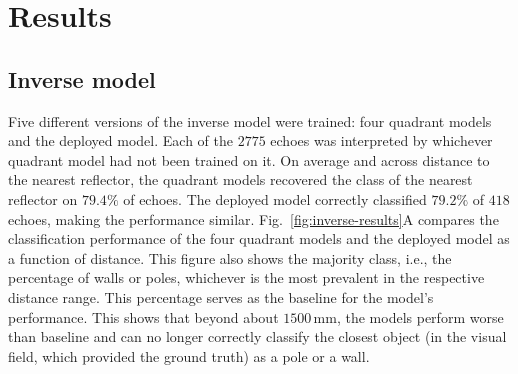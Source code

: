 \documentclass[11pt]{article}
\begin{document}


\section{Results}

\subsection{Inverse model}

Five different versions of the inverse model were trained: four quadrant models and the deployed model. Each of the $2775$ echoes was interpreted by whichever quadrant model had not been trained on it. On average and across distance to the nearest reflector, the quadrant models recovered the class of the nearest reflector on $79.4\%$ of echoes. The deployed model correctly classified $79.2\%$ of $418$ echoes, making the performance similar. Fig.~\ref{fig:inverse-results}A compares the classification performance of the four quadrant models and the deployed model as a function of distance. This figure also shows the majority class, i.e., the percentage of walls or poles, whichever is the most prevalent in the respective distance range. This percentage serves as the baseline for the model’s performance. This shows that beyond about $1500$\,mm, the models perform worse than baseline and can no longer correctly classify the closest object (in the visual field, which provided the ground truth) as a pole or a wall.
\end{document}
